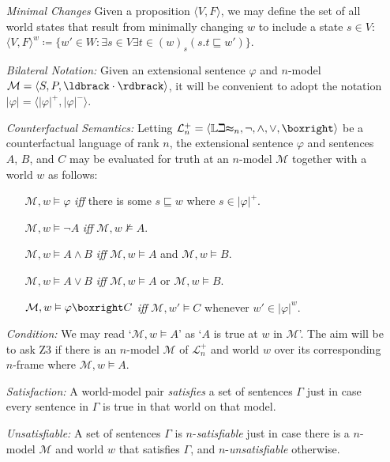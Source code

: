 \documentclass[a4paper, 11pt]{article} %
\newcommand{\tuple}[1]{\langle#1\rangle} %
\newcommand{\set}[1]{\lbrace#1\rbrace} %
\newcommand{\Lit}[0]{\mathbb{Lit}}
\newcommand{\M}[0]{\mathcal{M}}
\renewcommand{\L}[0]{\mathcal{L}}
\renewcommand{\Vert}[1]{\ldbrack#1\rdbrack}
\renewcommand{\vert}[1]{\lvert#1\rvert}
\begin{document}
\begin{enumerate}
  \item[\it Minimal Changes] Given a proposition $\tuple{V,F}$, we may define the set of all world states that result from minimally changing $w$ to include a state $s\in V$:\\ 
      $\tuple{V,F}^w\coloneq \set{w'\in W:\exists s\in V\exists t\in(w)_s(s.t\sqsubseteq w')}$.
  \item[\it Bilateral Notation:] Given an extensional sentence $\varphi$ and $n$-model $\M=\tuple{S,P,\Vert{\cdot}}$, it will be convenient to adopt the notation $\vert{\varphi}=\tuple{\vert{\varphi}^+,\vert{\varphi}^-}$.
  \item[\it Counterfactual Semantics:] Letting $\L_n^+=\tuple{\Lit_n,\neg,\wedge,\vee,\boxright}$ be a counterfactual language of rank $n$, the extensional sentence $\varphi$ and sentences $A$, $B$, and $C$ may be evaluated for truth at an $n$-model $\M$ together with a world $w$ as follows:
    \begin{itemize}
      \item[] $\M, w \vDash \varphi$ \textit{iff} there is some $s \sqsubseteq w$ where $s \in \vert{\varphi}^+$.
      \item[] $\M, w \vDash \neg A$ \textit{iff} $\M, w \nvDash A$.
      \item[] $\M, w \vDash A \wedge B$ \textit{iff} $\M, w \vDash A$ and $\M, w \vDash B$.
      \item[] $\M, w \vDash A \vee B$ \textit{iff} $\M, w \vDash A$ or $\M, w \vDash B$.
      \item[] $\M, w \vDash \varphi\boxright C$ \textit{iff} $\M, w' \vDash C$ whenever $w'\in\vert{\varphi}^w$.
    \end{itemize}
  \item[\it Condition:] We may read `$\M, w \vDash A$' as `$A$ is true at $w$ in $\M$'. 
    The aim will be to ask Z3 if there is an $n$-model $\M$ of $\L_n^+$ and world $w$ over its corresponding $n$-frame where $\M, w \vDash A$.
  \item[\it Satisfaction:] A world-model pair \textit{satisfies} a set of sentences $\Gamma$ just in case every sentence in $\Gamma$ is true in that world on that model.
  \item[\it Unsatisfiable:] A set of sentences $\Gamma$ is $n$-\textit{satisfiable} just in case there is a $n$-model $\M$ and world $w$ that satisfies $\Gamma$, and $n$-\textit{unsatisfiable} otherwise.

\end{enumerate}
\end{document}
